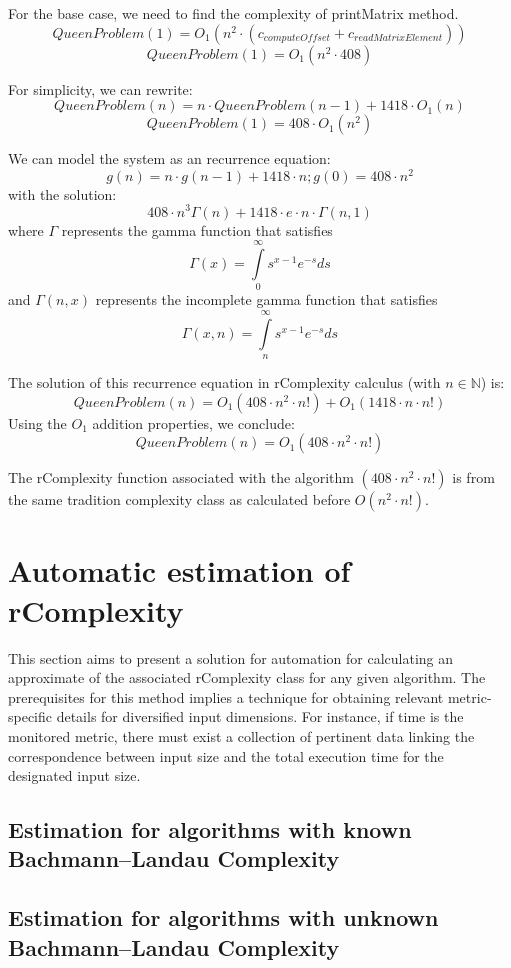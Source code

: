 For the base case, we need to find the complexity of printMatrix method.
\[ QueenProblem(1)=O_{1}(n^{2} \cdot  (c_{computeOffset} + c_{readMatrixElement}))\]
\[ QueenProblem(1)=O_{1}(n^{2} \cdot  408) \]

For simplicity, we can rewrite:
\[QueenProblem(n) = n \cdot QueenProblem(n-1) +  1418 \cdot O_{1}(n) \]
\[ QueenProblem(1)= 408 \cdot O_{1}(n^{2}) \]

We can model the system as an recurrence equation:
\[ g(n) = n \cdot  g(n-1) + 1418 \cdot  n; g(0) = 408 \cdot  n^{2} \]
with the solution:
\[ 408 \cdot n^{3} \Gamma(n) + 1418 \cdot e \cdot  n \cdot \Gamma(n, 1)\]
where $\Gamma$ represents the gamma function that satisfies \[ \Gamma \left( x \right) = \int\limits_0^\infty {s^{x - 1} e^{ - s} ds} \] and $ \Gamma(n,x)$ represents the incomplete gamma function that satisfies \[ \Gamma \left(x, n \right) = \int\limits_n^\infty {s^{x - 1} e^{ - s} ds}\]

The solution of this recurrence equation in rComplexity calculus (with $n \in \mathbb{N}$) is:
\[ QueenProblem(n) = O_{1}(408 \cdot n^{2} \cdot n!) +  O_{1}(1418 \cdot n \cdot n!) \]
Using the $O_{1}$ addition properties, we conclude:
\[ QueenProblem(n) = O_{1}(408 \cdot n^{2} \cdot n!) \]

\begin{remark}
The rComplexity function associated with the algorithm $(408 \cdot n^{2} \cdot n!)$ is from the same tradition complexity class as calculated before $ O(n^2\cdot n!)$.
\end{remark}

\section{Automatic estimation of rComplexity}
This section aims to present a solution for automation for calculating an approximate of the associated rComplexity class for any given algorithm. The prerequisites for this method implies a technique for obtaining relevant metric-specific details for diversified input dimensions. For instance, if time is the monitored metric, there must exist a collection of pertinent data linking the correspondence between input size and the total execution time for the designated input size.

\subsection{Estimation for algorithms with known Bachmann–Landau Complexity}

\subsection{Estimation for algorithms with unknown Bachmann–Landau Complexity}